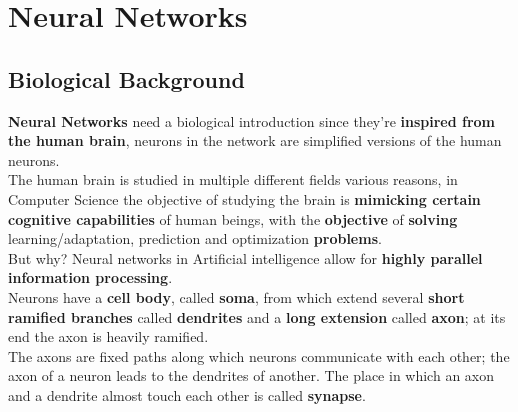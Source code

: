 \documentclass[11pt]{article}
\begin{document}
		\initcurrdate
		\maketitle 									%
		\newcommand{\nn}{\hfill \\}
		
		\tableofcontents
		
		\newpage
		
		\section{Neural Networks}
		
		\subsection{Biological Background}
		\textbf{Neural Networks} need a biological introduction since they're \textbf{inspired from the human brain}, neurons in the network are simplified versions of the human neurons.\\
		
		The human brain is studied in multiple different fields various reasons, in Computer Science the objective of studying the brain is \textbf{mimicking certain cognitive capabilities} of human beings, with the \textbf{objective} of \textbf{solving} learning/adaptation, prediction and optimization \textbf{problems}.\\
		
		But why? Neural networks in Artificial intelligence allow for \textbf{highly parallel information processing}.\\
		
		Neurons have a \textbf{cell body}, called \textbf{soma}, from which extend several \textbf{short ramified branches} called \textbf{dendrites} and a \textbf{long extension} called \textbf{axon}; at its end the axon is heavily ramified.\\
		
		The axons are fixed paths along which neurons communicate with each other; the axon of a neuron leads to the dendrites of another. The place in which an axon and a dendrite almost touch each other is called \textbf{synapse}.\\
		
\end{document}
